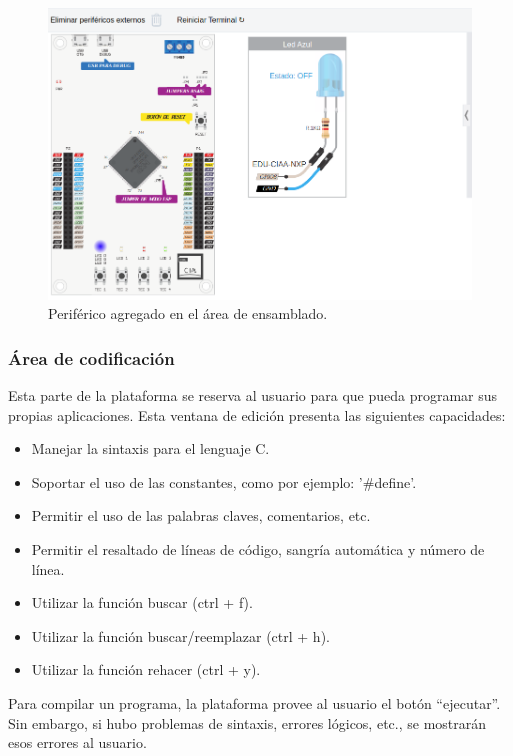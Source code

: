 \begin{figure}[ht]
	\centering
	\includegraphics[scale=.37]{./Figures/AgregarPeriferico2.png}
	\caption{Periférico agregado en el área de ensamblado. }
	\label{fig:AgregarPeriferico2}
\end{figure}

\subsubsection{Área de codificación}

Esta parte de la plataforma se reserva al usuario para que pueda programar sus propias aplicaciones. Esta ventana de edición presenta las siguientes capacidades:

\begin{itemize}
\item Manejar la sintaxis para el lenguaje C.
\item Soportar el uso de las constantes, como por ejemplo: '\#define'.
\item Permitir el uso de las palabras claves, comentarios, etc.
\item Permitir el resaltado de líneas de código, sangría automática y número de línea.
\item Utilizar la función buscar (ctrl + f).
\item Utilizar la función buscar/reemplazar (ctrl + h).
\item Utilizar la función rehacer (ctrl + y).
\end{itemize}

Para compilar un programa, la plataforma provee al usuario el botón “ejecutar”. Sin embargo, si hubo problemas de sintaxis, errores lógicos, etc., se mostrarán esos errores al usuario.

